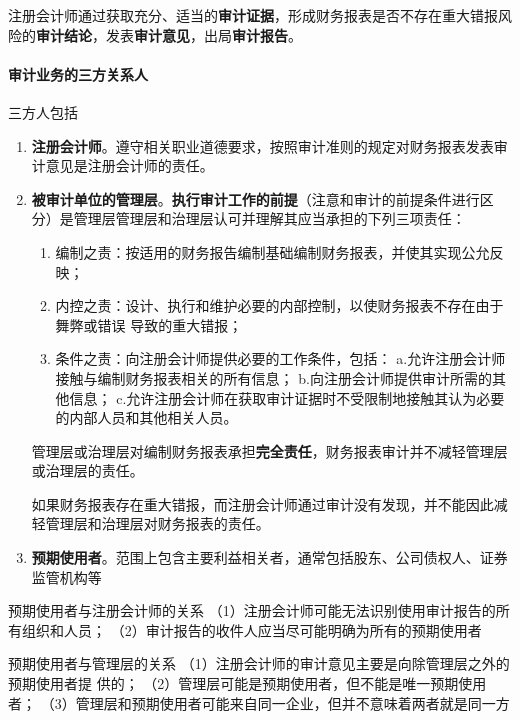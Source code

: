 \documentclass[UTF8,12pt]{ctexart}
\numberwithin{equation}{section} %
\numberwithin{figure}{section}
\numberwithin{table}{section}
\begin{document}
	注册会计师通过获取充分、适当的\textbf{审计证据}，形成财务报表是否不存在重大错报风险的\textbf{审计结论}，发表\textbf{审计意见}，出局\textbf{审计报告}。
	
	\paragraph{审计业务的三方关系人}
	三方人包括
	\begin{enumerate}
		\item \textbf{注册会计师}。遵守相关职业道德要求，按照审计准则的规定对财务报表发表审计意见是注册会计师的责任。
		
		\item \textbf{被审计单位的管理层}。\textbf{执行审计工作的前提}（注意和审计的前提条件进行区分）是管理层管理层和治理层认可并理解其应当承担的下列三项责任：
		\begin{enumerate}
			\item 编制之责：按适用的财务报告编制基础编制财务报表，并使其实现公允反映；
			
			\item 内控之责：设计、执行和维护必要的内部控制，以使财务报表不存在由于舞弊或错误
			导致的重大错报；
			
			\item 条件之责：向注册会计师提供必要的工作条件，包括：
			a.允许注册会计师接触与编制财务报表相关的所有信息；
			b.向注册会计师提供审计所需的其他信息；
			c.允许注册会计师在获取审计证据时不受限制地接触其认为必要的内部人员和其他相关人员。
		\end{enumerate}
		
		管理层或治理层对编制财务报表承担\textbf{完全责任}，财务报表审计并不减轻管理层或治理层的责任。
		
		如果财务报表存在重大错报，而注册会计师通过审计没有发现，并不能因此减轻管理层和治理层对财务报表的责任。
		
		\item \textbf{预期使用者}。范围上包含主要利益相关者，通常包括股东、公司债权人、证券监管机构等
	\end{enumerate}
	
	预期使用者与注册会计师的关系
	（1）注册会计师可能无法识别使用审计报告的所有组织和人员；
	（2）审计报告的收件人应当尽可能明确为所有的预期使用者
	
	预期使用者与管理层的关系
	（1）注册会计师的审计意见主要是向除管理层之外的预期使用者提
	供的；
	（2）管理层可能是预期使用者，但不能是唯一预期使用者；
	（3）管理层和预期使用者可能来自同一企业，但并不意味着两者就是同一方
	
\end{document}

